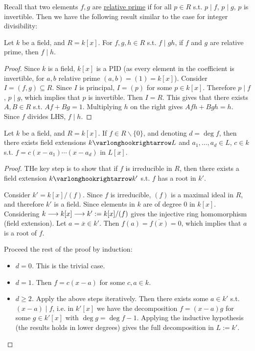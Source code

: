 \documentclass{article}
\begin{document}
\textstart
Recall that two elements $f, g$ are \underline{relative prime} if for all $p \in R$ s.t. $p \mid f$, $p \mid g$, $p$ is invertible. Then we have the following result similar to the case for integer divisibility:

\begin{proposition}\label{prop: divisibility for relative prime polynomials}
    Let $k$ be a field, and $R = k[x]$. For $f, g, h \in R$ s.t. $f \mid gh$, if $f$ and $g$ are relative prime, then $f \mid h$.
\end{proposition}

\begin{proof}
    Since $k$ is a field, $k[x]$ is a PID (as every element in the coefficient is invertible, for $a, b$ relative prime $(a, b) = (1) = k[x]$). Consider $I = (f, g) \subseteq R$. Since $I$ is principal, $I = (p)$ for some $p \in k[x]$. Therefore $p \mid f$, $p \mid g$, which implies that $p$ is invertible. Then $I = R$. This gives that there exists $A, B \in R$ s.t. $Af + Bg = 1$. Multiplying $h$ on the right gives $Afh + Bgh = h$. Since $f$ divides LHS, $f \mid h$.
\end{proof}

\begin{proposition}
    Let $k$ be a field, and $R = k[x]$. If $f \in R \smallsetminus \{0\}$, and denoting $d = \deg f$, then there exists field extensions $k \ext L$ and $a_1, \dots, a_d \in L$, $c \in k$ s.t. $f = c(x - a_1)\cdots (x - a_d)$ in $L[x]$.
\end{proposition}

\begin{proof}
    THe key step is to show that if $f$ is irreducible in $R$, then there exists a field extension $k \ext k'$ s.t. $f$ has a root in $k'$.

    Consider $k' = k[x]/(f)$. Since $f$ is irreducible, $(f)$ is a maximal ideal in $R$, and therefore $k'$ is a field. Since elements in $k$ are of degree 0 in $k[x]$. Considering $k \longrightarrow k[x] \longrightarrow k' := k[x]/(f)$ gives the injective ring homomorphism (field extension). Let $a = \overline{x} \in k'$. Then $f(a) = \overline{f(x)} = 0$, which implies that $a$ is a root of $f$.

    Proceed the rest of the proof by induction: 
    \begin{itemize}
        \item \emph{$d = 0$.} This is the trivial case.
        \item \emph{$d = 1$.} Then $f = c(x - a)$ for some $c, a \in k$.
        \item \emph{$d \geq 2$.} Apply the above steps iteratively. Then there exists some $a \in k'$ s.t. $(x - a) \mid f$, i.e. in $k'[x]$ we have the decomposition $f = (x - a) g$ for some $g \in k'[x]$ with $\deg g = \deg f - 1$. Applying the inductive hypothesis (the results holds in lower degrees) gives the full decomposition in $L := k'$. 
    \end{itemize}
\end{proof}
\end{document}
